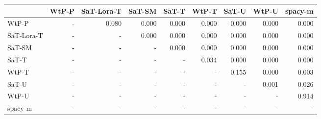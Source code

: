 \begin{tabular}{lrrrrrrrr}
\toprule
 & WtP-P & SaT-Lora-T & SaT-SM & SaT-T & WtP-T & SaT-U & WtP-U & spacy-m \\
\midrule
WtP-P & - & 0.080 & 0.000 & 0.000 & 0.000 & 0.000 & 0.000 & 0.000 \\
SaT-Lora-T & - & - & 0.000 & 0.000 & 0.000 & 0.000 & 0.000 & 0.000 \\
SaT-SM & - & - & - & 0.000 & 0.000 & 0.000 & 0.000 & 0.000 \\
SaT-T & - & - & - & - & 0.034 & 0.000 & 0.000 & 0.000 \\
WtP-T & - & - & - & - & - & 0.155 & 0.000 & 0.003 \\
SaT-U & - & - & - & - & - & - & 0.001 & 0.026 \\
WtP-U & - & - & - & - & - & - & - & 0.914 \\
spacy-m & - & - & - & - & - & - & - & - \\
\bottomrule
\end{tabular}

